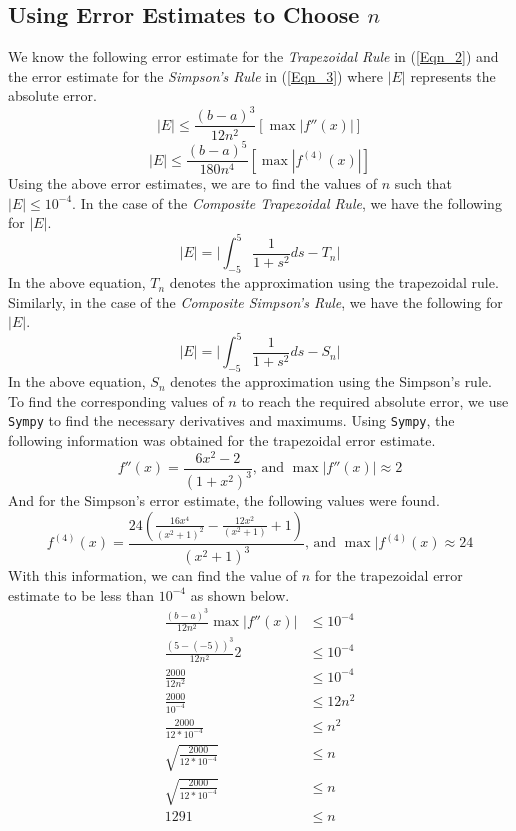 \documentclass{article}
\begin{document}
\subsection{Using Error Estimates to Choose \(n\)}
We know the following error estimate for the \textit{Trapezoidal Rule} in (\ref{Eqn_2}) and the error estimate for the \textit{Simpson's Rule} in (\ref{Eqn_3}) where \(|E|\) represents the absolute error.
\begin{equation}
    \label{Eqn_2}
    |E| \leq \frac{(b-a)^3}{12n^2}[\max|f''(x)|]
\end{equation}
\begin{equation}
    \label{Eqn_3}
    |E| \leq \frac{(b-a)^5}{180n^4}[\max|f^{(4)}(x)|]
\end{equation}
Using the above error estimates, we are to find the values of \(n\) such that \(|E|  \leq 10^{-4}\). In the case of the \textit{Composite Trapezoidal Rule}, we have the following for \(|E|\).
\[
|E| = \Bigg|\int_{-5}^5\frac{1}{1+s^2}ds-T_n\Bigg|
\]
In the above equation, \(T_n\) denotes the approximation using the trapezoidal rule. Similarly, in the case of the \textit{Composite Simpson's Rule}, we have the following for \(|E|\).
\[
|E| = \Bigg|\int_{-5}^5\frac{1}{1+s^2}ds-S_n\Bigg|
\]
In the above equation, \(S_n\) denotes the approximation using the Simpson's rule. To find the corresponding values of \(n\) to reach the required absolute error, we use \texttt{Sympy} to find the necessary derivatives and maximums. Using \texttt{Sympy}, the following information was obtained for the trapezoidal error estimate.
\[
f''(x) = \frac{6x^2-2}{(1+x^2)^3} \mbox{, and }\max|f''(x)| \approx 2
\]
And for the Simpson's error estimate, the following values were found.
\[
f^{(4)}(x) = \frac{24 \left( \frac{16x^4}{(x^2 + 1)^2} - \frac{12x^2}{(x^2 + 1)} + 1 \right)}{(x^2 + 1)^3}\mbox{, and }\max|f^{(4)}(x) \approx 24
\]
With this information, we can find the value of \(n\) for the trapezoidal error estimate to be less than \(10^{-4}\) as shown below.
\[
\begin{split}
    \frac{(b-a)^3}{12n^2}\max|f''(x)| &\leq 10^{-4} \\
    \frac{(5-(-5))^3}{12n^2}2 &\leq 10^{-4} \\
    \frac{2000}{12n^2} &\leq 10^{-4} \\
    \frac{2000}{10^{-4}} &\leq 12n^2 \\
    \frac{2000}{12*10^{-4}} &\leq n^2 \\
    \sqrt{\frac{2000}{12*10^{-4}}} &\leq n \\
    \sqrt{\frac{2000}{12*10^{-4}}} &\leq n \\
    1291 &\leq n \\
\end{split}
\]
\end{document}

